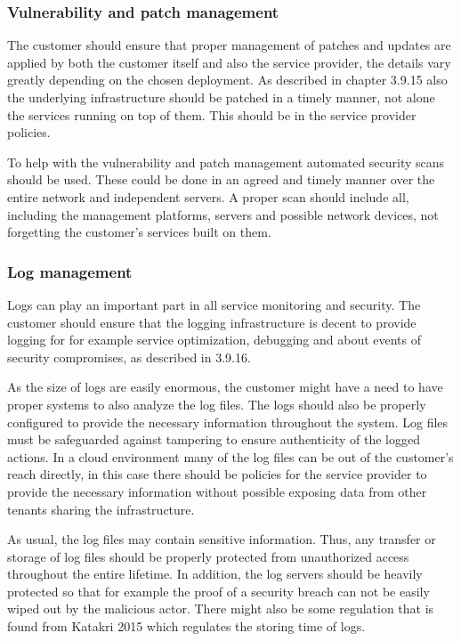 \documentclass{article}
\begin{document}
\subsubsection{Vulnerability and patch management}
The customer should ensure that proper management of patches and updates are applied by both the customer itself and also the service provider, the details vary greatly depending on the chosen deployment. As described in chapter 3.9.15 also the underlying infrastructure should be patched in a timely manner, not alone the services running on top of them. This should be in the service provider policies.
\par
To help with the vulnerability and patch management automated security scans should be used. These could be done in an agreed and timely manner over the entire network and independent servers. A proper scan should include all, including the management platforms, servers and possible network devices, not forgetting the customer's services built on them.

\subsubsection{Log management}
Logs can play an important part in all service monitoring and security. The customer should ensure that the logging infrastructure is decent to provide logging for for example service optimization, debugging and about events of security compromises, as described in 3.9.16.
\par
As the size of logs are easily enormous, the customer might have a need to have proper systems to also analyze the log files. The logs should also be properly configured to provide the necessary information throughout the system. Log files must be safeguarded against tampering to ensure authenticity of the logged actions. In a cloud environment many of the log files can be out of the customer's reach directly, in this case there should be policies for the service provider to provide the necessary information without possible exposing data from other tenants sharing the infrastructure.
\par
As usual, the log files may contain sensitive information. Thus, any transfer or storage of log files should be properly protected from unauthorized access throughout the entire lifetime. In addition, the log servers should be heavily protected so that for example the proof of a security breach can not be easily wiped out by the malicious actor. There might also be some regulation that is found from Katakri 2015 which regulates the storing time of logs.
\end{document}
